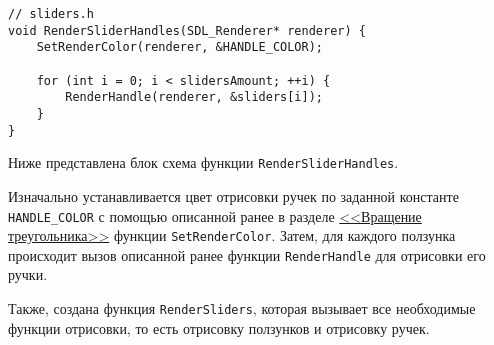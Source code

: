 \documentclass[14pt]{extarticle}
\begin{document}
{    \begin{lstlisting}
// sliders.h
void RenderSliderHandles(SDL_Renderer* renderer) {
	SetRenderColor(renderer, &HANDLE_COLOR);
	
	for (int i = 0; i < slidersAmount; ++i) {
		RenderHandle(renderer, &sliders[i]);
	}
}\end{lstlisting}

    \begin{spacing}{1.5}
        \noindent
        Ниже представлена блок схема функции \verb|RenderSliderHandles|.
    \end{spacing}

    \vspace{-0.5em}

    \begin{center}
    \end{center}

    \begin{spacing}{1.5}
        Изначально устанавливается цвет отрисовки ручек по заданной константе \verb|HANDLE_COLOR| с помощью описанной ранее в разделе \hyperref[sec:setcolor]{<<Вращение треугольника>>} функции \verb|SetRenderColor|. Затем, для каждого ползунка происходит вызов описанной ранее функции \verb|RenderHandle| для отрисовки его ручки.
        \par
        Также, создана функция \verb|RenderSliders|, которая вызывает все необходимые функции отрисовки, то есть отрисовку ползунков и отрисовку ручек.
    \end{spacing}

}
\end{document}
